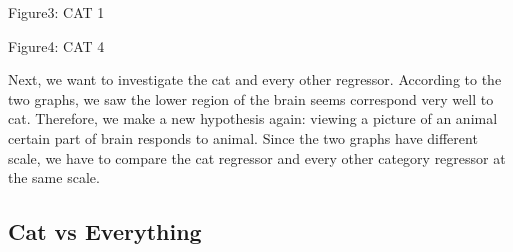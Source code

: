 \documentclass[11pt]{article}
\begin{document}
\begin{housevsface}
  \centering
    \caption{Figure3: CAT 1}
  \centering
    \caption{Figure4: CAT 4}
           
Next, we want to investigate the cat and every other regressor. 
According to the two graphs, we saw the lower region of the brain seems correspond very well to cat. Therefore, we make a new hypothesis again:  viewing a picture of an animal certain part of brain responds to animal. Since the two graphs have different scale, we have to compare the cat regressor and every other category regressor at the same scale.



\subsection{Cat vs Everything}


\end{housevsface}
\end{document}
